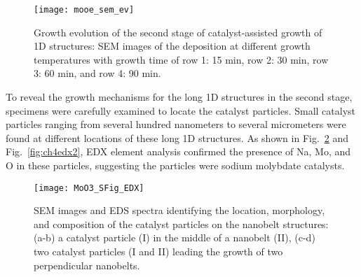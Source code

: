 \begin{figure}[htb]
\centering
\texttt{[image: mooe\_sem\_ev]}
\caption[Evolution of the second stage on  growth]{Growth evolution of the second stage of catalyst-assisted growth of  1D structures: SEM images of the deposition at different growth temperatures with growth time of row 1: 15 min, row 2: 30 min, row 3: 60 min, and row 4: 90 min.}
\label{fig:ch4ev}
\end{figure}
To reveal the growth mechanisms for the long 1D structures in the second stage, specimens were carefully examined to locate the catalyst particles. Small catalyst particles ranging from several hundred nanometers to several micrometers were found at different locations of these long 1D structures. As shown in Fig.~\ref{fig:ch4edx1} and Fig.~\ref{fig:ch4edx2}, EDX element analysis confirmed the presence of Na, Mo, and O in these particles, suggesting the particles were sodium molybdate catalysts.  

\begin{figure}[htb]
\centering
\texttt{[image: MoO3\_SFig\_EDX]}
\caption[Identifying the catalyst particles on the nanobelt structures]{SEM images and EDS spectra identifying the location, morphology, and composition of the catalyst particles on the nanobelt structures: (a-b) a catalyst particle (I) in the middle of a nanobelt (II), (c-d) two catalyst particles (I and II) leading the growth of two perpendicular nanobelts.}
\label{fig:ch4edx1}
\end{figure}

